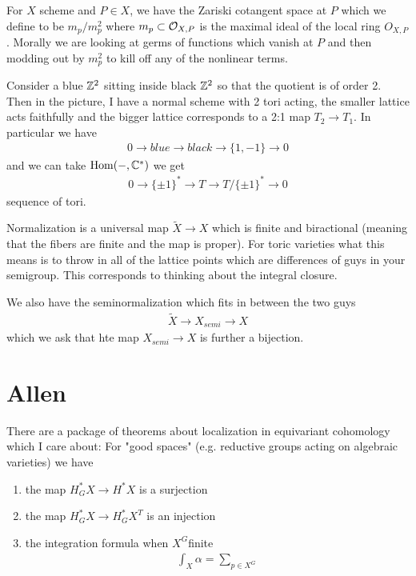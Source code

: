 \documentclass[12pt]{article}
\begin{document}
\begin{definition}
    For $X$ scheme and $P\in X$, we have the Zariski cotangent space at $P$ which we define to be $m_p/m_p^2$ where $m_p\subset \mathcal{O}_{X,P}$ is the maximal ideal of the local ring $O_{X,P}$. Morally we are looking at germs of functions which vanish at $P$ and then modding out by $m_p^2$ to kill off any of the nonlinear terms.
\end{definition}

\begin{example}
    Consider a blue $\mathbb{Z}^2$ sitting inside black $\mathbb{Z}^2$ so that the quotient is of order 2. Then in the picture, I have a normal scheme with 2 tori acting, the smaller lattice acts faithfully and the bigger lattice corresponds to a 2:1 map $T_2\to T_1$. In particular we have \begin{align*}
        0\to blue \to black\to \{1,-1\}\to 0
    \end{align*} and we can take $\operatorname{Hom}(-,\mathbb{C}^*)$ we get \begin{align*}
        0\to \{\pm 1\}^* \to T \to T/\{\pm 1\}^*\to 0
    \end{align*} sequence of tori.
\end{example}

\begin{definition}
    Normalization is a universal map $\tilde X\to X$ which is finite and biractional (meaning that the fibers are finite and the map is proper). For toric varieties what this means is to throw in all of the lattice points which are differences of guys in your semigroup. This corresponds to thinking about the integral closure.

    \hfill

    We also have the seminormalization which fits in between the two guys \begin{align*}
        \tilde X\to X_{semi}\to X 
    \end{align*} which we ask that hte map $X_{semi}\to X$ is further a bijection.
\end{definition}

\section{Allen}
There are a package of theorems about localization in equivariant cohomology which I care about: For "good spaces" (e.g. reductive groups acting on algebraic varieties) we have \begin{enumerate}
    \item the map $H^*_GX\to H^*X$ is a surjection
    \item the map $H^*_GX\to H^*_GX^T$ is an injection
    \item the integration formula when $X^G $finite\begin{align*}
        \int_X\alpha = \sum_{p\in X^G}
    \end{align*}
\end{enumerate}
\end{document}
